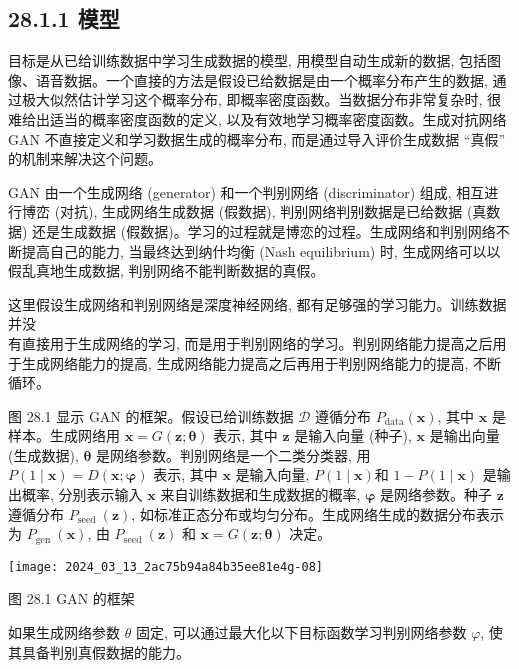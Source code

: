 \documentclass[10pt]{article}
\begin{document}
\subsection*{28.1.1 模型}
目标是从已给训练数据中学习生成数据的模型, 用模型自动生成新的数据, 包括图像、语音数据。一个直接的方法是假设已给数据是由一个概率分布产生的数据, 通过极大似然估计学习这个概率分布, 即概率密度函数。当数据分布非常复杂时, 很难给出适当的概率密度函数的定义, 以及有效地学习概率密度函数。生成对抗网络 GAN 不直接定义和学习数据生成的概率分布, 而是通过导入评价生成数据 “真假” 的机制来解决这个问题。

GAN 由一个生成网络 (generator) 和一个判别网络 (discriminator) 组成, 相互进行博峦 (对抗), 生成网络生成数据 (假数据), 判别网络判别数据是已给数据 (真数据) 还是生成数据 (假数据)。学习的过程就是博恋的过程。生成网络和判别网络不断提高自己的能力, 当最终达到纳什均衡 (Nash equilibrium) 时, 生成网络可以以假乱真地生成数据, 判别网络不能判断数据的真假。

这里假设生成网络和判别网络是深度神经网络, 都有足够强的学习能力。训练数据并没\\
有直接用于生成网络的学习, 而是用于判别网络的学习。判别网络能力提高之后用于生成网络能力的提高, 生成网络能力提高之后再用于判别网络能力的提高, 不断循环。

图 28.1 显示 GAN 的框架。假设已给训练数据 $\mathcal{D}$ 遵循分布 $P_{\mathrm{data}}(\boldsymbol{x})$, 其中 $\boldsymbol{x}$ 是样本。生成网络用 $\boldsymbol{x}=G(\boldsymbol{z} ; \boldsymbol{\theta})$ 表示, 其中 $\boldsymbol{z}$ 是输入向量 (种子), $\boldsymbol{x}$ 是输出向量 (生成数据), $\boldsymbol{\theta}$ 是网络参数。判别网络是一个二类分类器, 用 $P(1 \mid \boldsymbol{x})=D(\boldsymbol{x} ; \boldsymbol{\varphi})$ 表示, 其中 $\boldsymbol{x}$ 是输入向量, $P(1 \mid \boldsymbol{x})$和 $1-P(1 \mid \boldsymbol{x})$ 是输出概率, 分别表示输入 $\boldsymbol{x}$ 来自训练数据和生成数据的概率, $\boldsymbol{\varphi}$ 是网络参数。种子 $\boldsymbol{z}$ 遵循分布 $P_{\text {seed }}(\boldsymbol{z})$, 如标准正态分布或均匀分布。生成网络生成的数据分布表示为 $P_{\text {gen }}(\boldsymbol{x})$, 由 $P_{\text {seed }}(\boldsymbol{z})$ 和 $\boldsymbol{x}=G(\boldsymbol{z} ; \boldsymbol{\theta})$ 决定。

\begin{center}
\texttt{[image: 2024\_03\_13\_2ac75b94a84b35ee81e4g-08]}
\end{center}

图 28.1 GAN 的框架

如果生成网络参数 $\theta$ 固定, 可以通过最大化以下目标函数学习判别网络参数 $\varphi$, 使其具备判别真假数据的能力。
\end{document}
